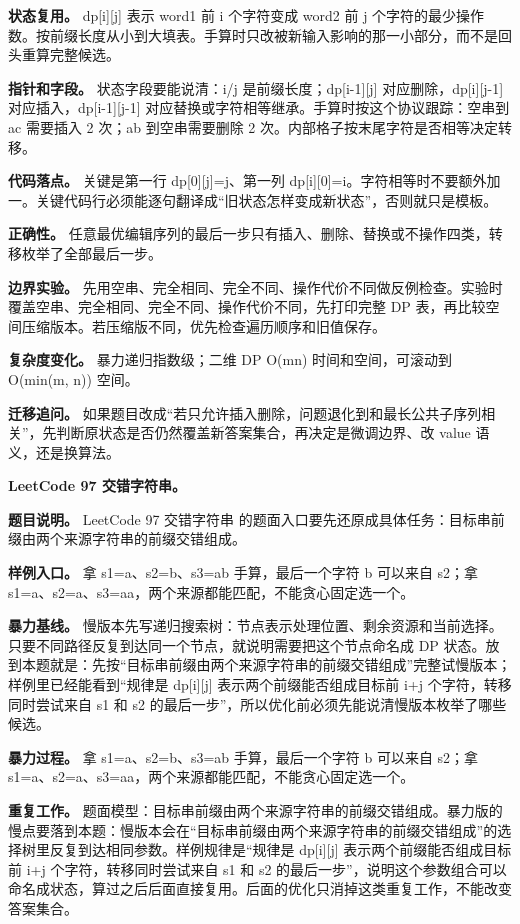 \textbf{状态复用。} dp[i][j] 表示 word1 前 i 个字符变成 word2 前 j 个字符的最少操作数。按前缀长度从小到大填表。手算时只改被新输入影响的那一小部分，而不是回头重算完整候选。

\textbf{指针和字段。} 状态字段要能说清：i/j 是前缀长度；dp[i-1][j] 对应删除，dp[i][j-1] 对应插入，dp[i-1][j-1] 对应替换或字符相等继承。手算时按这个协议跟踪：空串到 ac 需要插入 2 次；ab 到空串需要删除 2 次。内部格子按末尾字符是否相等决定转移。

\textbf{代码落点。} 关键是第一行 dp[0][j]=j、第一列 dp[i][0]=i。字符相等时不要额外加一。关键代码行必须能逐句翻译成“旧状态怎样变成新状态”，否则就只是模板。

\textbf{正确性。} 任意最优编辑序列的最后一步只有插入、删除、替换或不操作四类，转移枚举了全部最后一步。

\textbf{边界实验。} 先用空串、完全相同、完全不同、操作代价不同做反例检查。实验时覆盖空串、完全相同、完全不同、操作代价不同，先打印完整 DP 表，再比较空间压缩版本。若压缩版不同，优先检查遍历顺序和旧值保存。

\textbf{复杂度变化。} 暴力递归指数级；二维 DP O(mn) 时间和空间，可滚动到 O(min(m, n)) 空间。

\textbf{迁移追问。} 如果题目改成“若只允许插入删除，问题退化到和最长公共子序列相关”，先判断原状态是否仍然覆盖新答案集合，再决定是微调边界、改 value 语义，还是换算法。

\noindent\textbf{LeetCode 97 交错字符串。}

\textbf{题目说明。} LeetCode 97 交错字符串 的题面入口要先还原成具体任务：目标串前缀由两个来源字符串的前缀交错组成。

\textbf{样例入口。} 拿 s1=a、s2=b、s3=ab 手算，最后一个字符 b 可以来自 s2；拿 s1=a、s2=a、s3=aa，两个来源都能匹配，不能贪心固定选一个。

\textbf{暴力基线。} 慢版本先写递归搜索树：节点表示处理位置、剩余资源和当前选择。只要不同路径反复到达同一个节点，就说明需要把这个节点命名成 DP 状态。放到本题就是：先按“目标串前缀由两个来源字符串的前缀交错组成”完整试慢版本；样例里已经能看到“规律是 dp[i][j] 表示两个前缀能否组成目标前 i+j 个字符，转移同时尝试来自 s1 和 s2 的最后一步”，所以优化前必须先能说清慢版本枚举了哪些候选。

\textbf{暴力过程。} 拿 s1=a、s2=b、s3=ab 手算，最后一个字符 b 可以来自 s2；拿 s1=a、s2=a、s3=aa，两个来源都能匹配，不能贪心固定选一个。

\textbf{重复工作。} 题面模型：目标串前缀由两个来源字符串的前缀交错组成。暴力版的慢点要落到本题：慢版本会在“目标串前缀由两个来源字符串的前缀交错组成”的选择树里反复到达相同参数。样例规律是“规律是 dp[i][j] 表示两个前缀能否组成目标前 i+j 个字符，转移同时尝试来自 s1 和 s2 的最后一步”，说明这个参数组合可以命名成状态，算过之后后面直接复用。后面的优化只消掉这类重复工作，不能改变答案集合。

